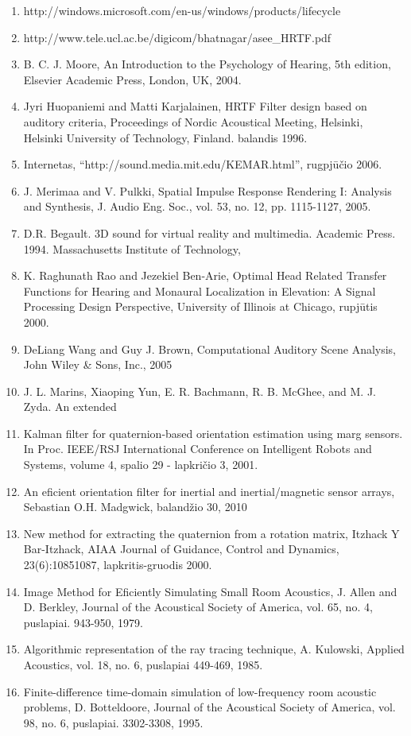 \documentclass[]{vgtuef}
\begin{document}
\begin{enumerate}
\item http://windows.microsoft.com/en-us/windows/products/lifecycle
\item http://www.tele.ucl.ac.be/digicom/bhatnagar/asee\_HRTF.pdf
\item B. C. J. Moore, An Introduction to the Psychology of Hearing, 5th edition, Elsevier Academic Press, London, UK, 2004.
\item Jyri Huopaniemi and Matti Karjalainen, HRTF Filter design based on auditory criteria, Proceedings of Nordic Acoustical Meeting, Helsinki, Helsinki University of Technology, Finland. balandis 1996.
\item Internetas, “http://sound.media.mit.edu/KEMAR.html”, rugpjūčio 2006.
\item J. Merimaa and V. Pulkki, Spatial Impulse Response Rendering I: Analysis and Synthesis, J. Audio Eng. Soc., vol. 53, no. 12, pp. 1115-1127, 2005. 
\item D.R. Begault. 3D sound for virtual reality and multimedia. Academic Press. 1994. Massachusetts Institute of Technology, 
\item K. Raghunath Rao and Jezekiel Ben-Arie, Optimal Head Related Transfer Functions for Hearing and Monaural Localization in Elevation: A Signal Processing Design Perspective, University of Illinois at Chicago, rupjūtis 2000.
\item DeLiang Wang and Guy J. Brown, Computational Auditory Scene Analysis, John Wiley \& Sons, Inc., 2005
\item J. L. Marins, Xiaoping Yun, E. R. Bachmann, R. B. McGhee, and M. J. Zyda. An extended
\item Kalman filter for quaternion-based orientation estimation using marg sensors. In Proc. IEEE/RSJ International Conference on Intelligent Robots and Systems, volume 4, spalio 29 - lapkričio 3, 2001.
\item An eficient orientation filter for inertial and inertial/magnetic sensor arrays, Sebastian O.H. Madgwick, balandžio 30, 2010
\item New method for extracting the quaternion from a rotation matrix, Itzhack Y Bar-Itzhack, AIAA Journal of Guidance, Control and Dynamics, 23(6):10851087, lapkritis-gruodis 2000.
\item Image Method for Eficiently Simulating Small Room Acoustics, J. Allen and D. Berkley, Journal of the Acoustical Society of America, vol. 65, no. 4, puslapiai. 943-950, 1979.
\item Algorithmic representation of the ray tracing technique, A. Kulowski, Applied Acoustics, vol. 18, no. 6, puslapiai 449-469, 1985.
\item Finite-difference time-domain simulation of low-frequency room acoustic problems, D. Botteldoore, Journal of the Acoustical Society of America, vol. 98, no. 6, puslapiai. 3302-3308, 1995.
\end{enumerate}
\end{document}
